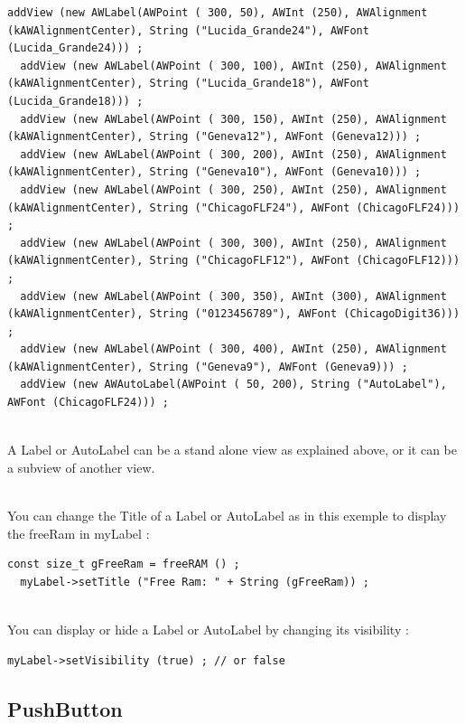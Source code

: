\documentclass[a4paper,11pt]{extarticle}
\begin{document}
\begin{lstlisting}[language=Arduinonl]
  addView (new AWLabel(AWPoint ( 300, 50), AWInt (250), AWAlignment (kAWAlignmentCenter), String ("Lucida_Grande24"), AWFont (Lucida_Grande24))) ;
  addView (new AWLabel(AWPoint ( 300, 100), AWInt (250), AWAlignment (kAWAlignmentCenter), String ("Lucida_Grande18"), AWFont (Lucida_Grande18))) ;
  addView (new AWLabel(AWPoint ( 300, 150), AWInt (250), AWAlignment (kAWAlignmentCenter), String ("Geneva12"), AWFont (Geneva12))) ;
  addView (new AWLabel(AWPoint ( 300, 200), AWInt (250), AWAlignment (kAWAlignmentCenter), String ("Geneva10"), AWFont (Geneva10))) ;
  addView (new AWLabel(AWPoint ( 300, 250), AWInt (250), AWAlignment (kAWAlignmentCenter), String ("ChicagoFLF24"), AWFont (ChicagoFLF24))) ;
  addView (new AWLabel(AWPoint ( 300, 300), AWInt (250), AWAlignment (kAWAlignmentCenter), String ("ChicagoFLF12"), AWFont (ChicagoFLF12))) ;
  addView (new AWLabel(AWPoint ( 300, 350), AWInt (300), AWAlignment (kAWAlignmentCenter), String ("0123456789"), AWFont (ChicagoDigit36))) ;
  addView (new AWLabel(AWPoint ( 300, 400), AWInt (250), AWAlignment (kAWAlignmentCenter), String ("Geneva9"), AWFont (Geneva9))) ;
  addView (new AWAutoLabel(AWPoint ( 50, 200), String ("AutoLabel"), AWFont (ChicagoFLF24))) ;
\end{lstlisting}

~\\ A Label or AutoLabel can be a stand alone view as explained above, or it can be a subview of another view.

~\\ You can change the Title of a Label or AutoLabel as in this exemple to display the freeRam in myLabel :

\begin{lstlisting}[language=Arduinonl]
const size_t gFreeRam = freeRAM () ;
  myLabel->setTitle ("Free Ram: " + String (gFreeRam)) ;
 \end{lstlisting}

~\\ You can display or hide a Label or AutoLabel by changing its visibility :

\begin{lstlisting}[language=Arduinonl]
  myLabel->setVisibility (true) ; // or false
 \end{lstlisting}


\newpage
\subsection{PushButton}
\end{document}
